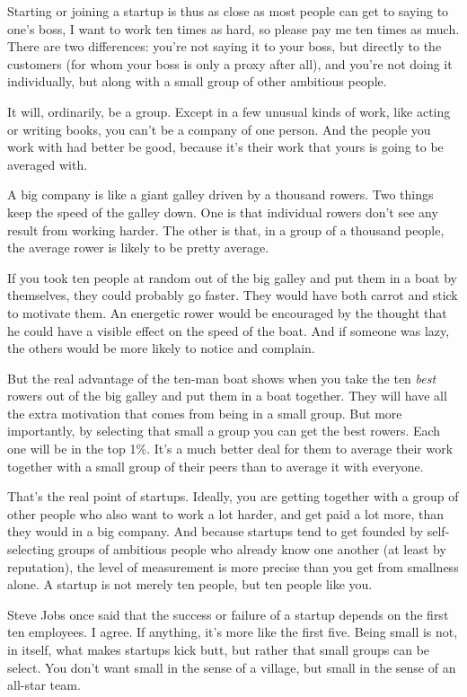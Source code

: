 Starting or joining a startup is thus as close as most people can get to
saying to one's boss, I want to work ten times as hard, so please pay me
ten times as much. There are two differences: you're not saying it to
your boss, but directly to the customers (for whom your boss is only a
proxy after all), and you're not doing it individually, but along with a
small group of other ambitious people.

It will, ordinarily, be a group. Except in a few unusual kinds of work,
like acting or writing books, you can't be a company of one person. And
the people you work with had better be good, because it's their work
that yours is going to be averaged with.

A big company is like a giant galley driven by a thousand rowers. Two
things keep the speed of the galley down. One is that individual rowers
don't see any result from working harder. The other is that, in a group
of a thousand people, the average rower is likely to be pretty average.

If you took ten people at random out of the big galley and put them in a
boat by themselves, they could probably go faster. They would have both
carrot and stick to motivate them. An energetic rower would be
encouraged by the thought that he could have a visible effect on the
speed of the boat. And if someone was lazy, the others would be more
likely to notice and complain.

But the real advantage of the ten-man boat shows when you take the ten
\emph{best} rowers out of the big galley and put them in a boat
together. They will have all the extra motivation that comes from being
in a small group. But more importantly, by selecting that small a group
you can get the best rowers. Each one will be in the top 1\%. It's a
much better deal for them to average their work together with a small
group of their peers than to average it with everyone.

That's the real point of startups. Ideally, you are getting together
with a group of other people who also want to work a lot harder, and get
paid a lot more, than they would in a big company. And because startups
tend to get founded by self-selecting groups of ambitious people who
already know one another (at least by reputation), the level of
measurement is more precise than you get from smallness alone. A startup
is not merely ten people, but ten people like you.

Steve Jobs once said that the success or failure of a startup depends on
the first ten employees. I agree. If anything, it's more like the first
five. Being small is not, in itself, what makes startups kick butt, but
rather that small groups can be select. You don't want small in the
sense of a village, but small in the sense of an all-star team.

